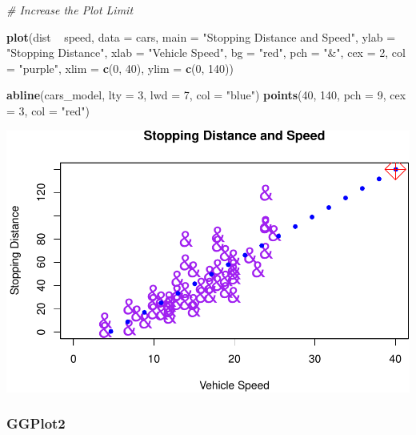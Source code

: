 \documentclass[]{article}
\newenvironment{Shaded}{}{}
\newcommand{\CommentTok}[1]{\textcolor[rgb]{0.38,0.63,0.69}{\textit{#1}}}
\newcommand{\DataTypeTok}[1]{\textcolor[rgb]{0.56,0.13,0.00}{#1}}
\newcommand{\DecValTok}[1]{\textcolor[rgb]{0.25,0.63,0.44}{#1}}
\newcommand{\KeywordTok}[1]{\textcolor[rgb]{0.00,0.44,0.13}{\textbf{#1}}}
\newcommand{\NormalTok}[1]{#1}
\newcommand{\OperatorTok}[1]{\textcolor[rgb]{0.40,0.40,0.40}{#1}}
\newcommand{\StringTok}[1]{\textcolor[rgb]{0.25,0.44,0.63}{#1}}
\begin{document}
\begin{Shaded}
\begin{Highlighting}[]
\CommentTok{# Increase the Plot Limit}

\KeywordTok{plot}\NormalTok{(dist }\OperatorTok{~}\StringTok{ }\NormalTok{speed, }\DataTypeTok{data =}\NormalTok{ cars,}
     \DataTypeTok{main =} \StringTok{"Stopping Distance and Speed"}\NormalTok{,}
     \DataTypeTok{ylab =} \StringTok{"Stopping Distance"}\NormalTok{,}
     \DataTypeTok{xlab =} \StringTok{"Vehicle Speed"}\NormalTok{,}
     \DataTypeTok{bg =} \StringTok{"red"}\NormalTok{,}
     \DataTypeTok{pch =} \StringTok{"&"}\NormalTok{, }\DataTypeTok{cex =} \DecValTok{2}\NormalTok{,}
     \DataTypeTok{col =} \StringTok{"purple"}\NormalTok{, }
     \DataTypeTok{xlim =} \KeywordTok{c}\NormalTok{(}\DecValTok{0}\NormalTok{, }\DecValTok{40}\NormalTok{), }
     \DataTypeTok{ylim =} \KeywordTok{c}\NormalTok{(}\DecValTok{0}\NormalTok{, }\DecValTok{140}\NormalTok{))}

\KeywordTok{abline}\NormalTok{(cars_model, }\DataTypeTok{lty =} \DecValTok{3}\NormalTok{, }\DataTypeTok{lwd =} \DecValTok{7}\NormalTok{, }\DataTypeTok{col =} \StringTok{"blue"}\NormalTok{)}
\KeywordTok{points}\NormalTok{(}\DecValTok{40}\NormalTok{, }\DecValTok{140}\NormalTok{, }\DataTypeTok{pch =} \DecValTok{9}\NormalTok{, }\DataTypeTok{cex =} \DecValTok{3}\NormalTok{, }\DataTypeTok{col =} \StringTok{"red"}\NormalTok{)}
\end{Highlighting}
\end{Shaded}

\includegraphics{./figure/unnamed-chunk-14-1.pdf}

\hypertarget{ggplot2}{%
\subsubsection{GGPlot2}\label{ggplot2}}
\end{document}
